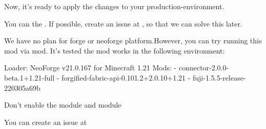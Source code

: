 Now, it's ready to apply the changes to your production-environment.


You can  the .
If possible, create an issue at \issueurl, so that we can solve this later.

We have no plan for forge or neoforge platform.However, you can try running this mod via  mod.
It's tested the mod works in the following environment:
\begin{sh}
    Loader: NeoForge v21.0.167 for Minecraft 1.21
    Mods:
    - connector-2.0.0-beta.1+1.21-full
    - forgified-fabric-api-0.101.2+2.0.10+1.21
    - fuji-1.5.5-release-220305a69b
\end{sh}
Don't enable the  module and  module


You can create an issue at \issueurl



